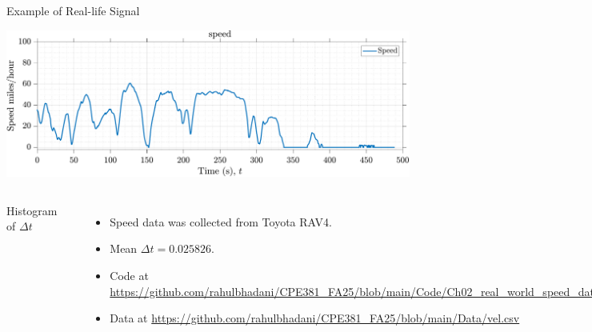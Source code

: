 \documentclass[aspectratio=169,xcolor=dvipsnames,svgnames,x11names,fleqn]{beamer}
\begin{document}
\begin{frame}{Example of Real-life Signal}

\begin{center}
\includegraphics[width=0.5\linewidth]{../Code/figures/Ch02_reallife_speed.pdf}

\end{center}


\begin{columns}

Histogram of $\Delta t$

\begin{center}
\includegraphics[width=0.5\linewidth]{../Code/figures/Ch02_reallife_speed_deltaT_Histogram.pdf}

\end{center}



\begin{itemize}
\footnotesize
\item Speed data was collected from Toyota RAV4.
\item Mean $\Delta t = 0.025826$.

\item Code at \url{https://github.com/rahulbhadani/CPE381_FA25/blob/main/Code/Ch02_real_world_speed_data.m}
\item Data at \url{https://github.com/rahulbhadani/CPE381_FA25/blob/main/Data/vel.csv}
\end{itemize}

\end{columns}

\end{frame}
\end{document}
